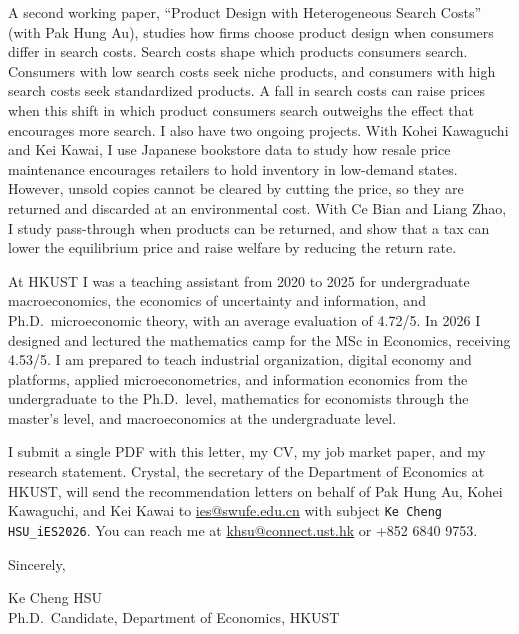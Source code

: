 \documentclass[11pt]{article}
\begin{document}
A second working paper, ``Product Design with Heterogeneous Search Costs'' (with Pak Hung Au), studies how firms choose product design when consumers differ in search costs. Search costs shape which products consumers search. Consumers with low search costs seek niche products, and consumers with high search costs seek standardized products. A fall in search costs can raise prices when this shift in which product consumers search outweighs the effect that encourages more search. I also have two ongoing projects. With Kohei Kawaguchi and Kei Kawai, I use Japanese bookstore data to study how resale price maintenance encourages retailers to hold inventory in low-demand states. However, unsold copies cannot be cleared by cutting the price, so they are returned and discarded at an environmental cost. With Ce Bian and Liang Zhao, I study pass-through when products can be returned, and show that a tax can lower the equilibrium price and raise welfare by reducing the return rate.

At HKUST I was a teaching assistant from 2020 to 2025 for undergraduate macroeconomics, the economics of uncertainty and information, and Ph.D.\ microeconomic theory, with an average evaluation of 4.72/5. In 2026 I designed and lectured the mathematics camp for the MSc in Economics, receiving 4.53/5. I am prepared to teach industrial organization, digital economy and platforms, applied microeconometrics, and information economics from the undergraduate to the Ph.D.\ level, mathematics for economists through the master's level, and macroeconomics at the undergraduate level.

I submit a single PDF with this letter, my CV, my job market paper, and my research statement. Crystal, the secretary of the Department of Economics at HKUST, will send the recommendation letters on behalf of Pak Hung Au, Kohei Kawaguchi, and Kei Kawai to \href{mailto:ies@swufe.edu.cn}{ies@swufe.edu.cn} with subject \texttt{Ke Cheng HSU\_iES2026}. You can reach me at \href{mailto:khsu@connect.ust.hk}{khsu@connect.ust.hk} or +852 6840 9753.

\vspace{0.25em}
Sincerely,

\vspace{0.25em}
Ke Cheng HSU \\
Ph.D.\ Candidate, Department of Economics, HKUST
\end{document}
